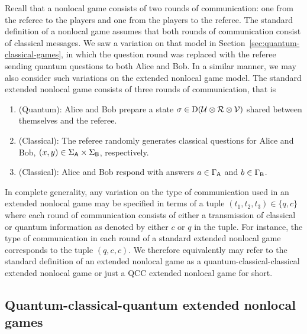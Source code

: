Recall that a nonlocal game consists of two rounds of communication: one from the referee to the players and one from the players to the referee. The standard definition of a nonlocal game assumes that both rounds of communication consist of classical messages. We saw a variation on that model in Section~\ref{sec:quantum-classical-games}, in which the question round was replaced with the referee sending quantum questions to both Alice and Bob. In a similar manner, we may also consider such variations on the extended nonlocal game model. The standard extended nonlocal game consists of three rounds of communication, that is
\begin{enumerate}
	\item (Quantum): Alice and Bob prepare a state $\sigma \in \mathrm{D}(\mathcal{U} \otimes \mathcal{R} \otimes \mathcal{V})$ shared between themselves and the referee. 
	\item (Classical): The referee randomly generates classical questions for Alice and Bob, $(x,y) \in \Sigma_{\mathsf{A}} \times \Sigma_{\mathsf{B}}$, respectively.
	\item (Classical): Alice and Bob respond with answers $a \in \Gamma_{\mathsf{A}}$ and $b \in \Gamma_{\mathsf{B}}$. 
\end{enumerate}
In complete generality, any variation on the type of communication used in an extended nonlocal game may be specified in terms of a tuple $(t_1,t_2,t_3) \in \{q,c\}$ where each round of communication consists of either a transmission of classical or quantum information as denoted by either $c$ or $q$ in the tuple. For instance, the type of communication in each round of a standard extended nonlocal game corresponds to the tuple $(q,c,c)$. We therefore equivalently may refer to the standard definition of an extended nonlocal game as a quantum-classical-classical extended nonlocal game or just a QCC extended nonlocal game for short. 


\subsection{Quantum-classical-quantum extended nonlocal games}

